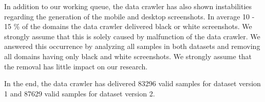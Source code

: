 In addition to our working queue, the data crawler has also shown instabilities regarding the generation of the mobile and desktop screenshots. In average 10 - 15 \% of the domains the data crawler delivered black or white screenshots. We strongly assume that this is solely caused by malfunction of the data crawler. We answered this occurrence by analyzing all samples in both datasets and removing all domains having only black and white screenshots. We strongly assume that the removal has little impact on our research.

In the end, the data crawler has delivered 83296 valid samples for dataset version 1 and 87629 valid samples for dataset version 2.